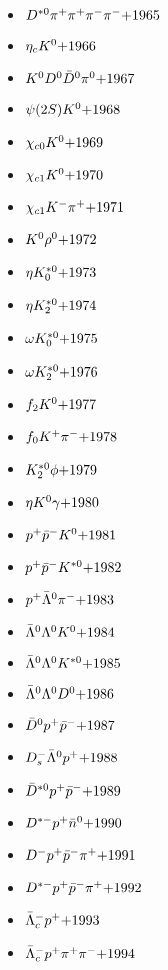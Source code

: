 \begin{multicols}{3}
\begin{itemize}
 \item $ D^{*0} \pi^{+} \pi^{+} \pi^{-} \pi^{-} \hfill{+1965}$
 \item $ \eta_{c} K^{0} \hfill{+1966}$
 \item $ K^{0} D^{0} \bar{D}^{0} \pi^{0} \hfill{+1967}$
 \item $ \psi(2S) K^{0} \hfill{+1968}$
 \item $ \chi_{c0} K^{0} \hfill{+1969}$
 \item $ \chi_{c1} K^{0} \hfill{+1970}$
 \item $ \chi_{c1} K^{-} \pi^{+} \hfill{+1971}$
 \item $ K^{0} \rho^{0} \hfill{+1972}$
 \item $ \eta K_{0}^{*0} \hfill{+1973}$
 \item $ \eta K_{2}^{*0} \hfill{+1974}$
 \item $ \omega K_{0}^{*0} \hfill{+1975}$
 \item $ \omega K_{2}^{*0} \hfill{+1976}$
 \item $ f_{2} K^{0} \hfill{+1977}$
 \item $ f_{0} K^{+} \pi^{-} \hfill{+1978}$
 \item $ K_{2}^{*0} \phi \hfill{+1979}$
 \item $ \eta K^{0} \gamma \hfill{+1980}$
 \item $ p^{+} \bar{p}^{-} K^{0} \hfill{+1981}$
 \item $ p^{+} \bar{p}^{-} K^{*0} \hfill{+1982}$
 \item $ p^{+} \bar{\Lambda}^{0} \pi^{-} \hfill{+1983}$
 \item $ \bar{\Lambda}^{0} \Lambda^{0} K^{0} \hfill{+1984}$
 \item $ \bar{\Lambda}^{0} \Lambda^{0} K^{*0} \hfill{+1985}$
 \item $ \bar{\Lambda}^{0} \Lambda^{0} D^{0} \hfill{+1986}$
 \item $ \bar{D}^{0} p^{+} \bar{p}^{-} \hfill{+1987}$
 \item $ D_{s}^{-} \bar{\Lambda}^{0} p^{+} \hfill{+1988}$
 \item $ \bar{D}^{*0} p^{+} \bar{p}^{-} \hfill{+1989}$
 \item $ D^{*-} p^{+} \bar{n}^{0} \hfill{+1990}$
 \item $ D^{-} p^{+} \bar{p}^{-} \pi^{+} \hfill{+1991}$
 \item $ D^{*-} p^{+} \bar{p}^{-} \pi^{+} \hfill{+1992}$
 \item $ \bar{\Lambda}_{c}^{-} p^{+} \hfill{+1993}$
 \item $ \bar{\Lambda}_{c}^{-} p^{+} \pi^{+} \pi^{-} \hfill{+1994}$

\end{itemize}
\end{multicols}
